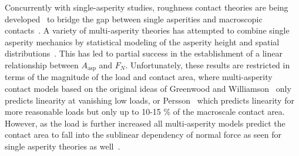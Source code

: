 
Concurrently with single-asperity studies, roughness contact theories are being developed~\cite{PhysRevLett.100.055504, Persson, GW, BUSH197587} to bridge the gap between single asperities and macroscopic contacts~\cite{mo_friction_2009}. A variety of multi-asperity theories has attempted to combine single asperity
mechanics by statistical modeling of the asperity height and spatial
distributions~\cite{CARBONE20082555}. This has led to partial success in the establishment of a linear relationship between $A_{\text{asp}}$ and $F_N$. Unfortunately, these results are restricted
in terms of the magnitude of the load and contact area, where multi-asperity
contact models based on the original ideas of Greenwood and Williamson~\cite{GW}
only predicts linearity at vanishing low loads, or Persson~\cite{Persson} which predicts linearity for more reasonable loads but only up to 10-15 \% of the macroscale contact area. However, as the load is further increased all multi-asperity models
predict the contact area to fall into the sublinear dependency of normal force
as seen for single asperity theories as well~\cite{CARBONE20082555}.








